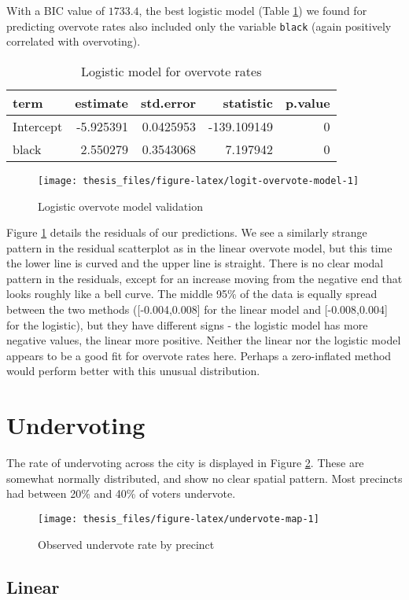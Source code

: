 \documentclass[12pt,twoside]{reedthesis}
\begin{document}
With a BIC value of \(1733.4\), the best logistic model (Table \ref{tab:logit-overvote-model}) we found for predicting overvote rates also included only the variable \texttt{black} (again positively correlated with overvoting).
\begin{table}[t]

\caption[Logit overvote model]{\label{tab:logit-overvote-model}Logistic model for overvote rates}
\centering
\begin{tabular}{lrrrr}
\toprule
term & estimate & std.error & statistic & p.value\\
\midrule
Intercept & -5.925391 & 0.0425953 & -139.109149 & 0\\
black & 2.550279 & 0.3543068 & 7.197942 & 0\\
\bottomrule
\end{tabular}
\end{table}
\begin{figure}
\texttt{[image: thesis\_files/figure-latex/logit-overvote-model-1]} \caption{Logistic overvote model validation}\label{fig:logit-overvote-model}
\end{figure}
Figure \ref{fig:logit-overvote-model} details the residuals of our predictions. We see a similarly strange pattern in the residual scatterplot as in the linear overvote model, but this time the lower line is curved and the upper line is straight. There is no clear modal pattern in the residuals, except for an increase moving from the negative end that looks roughly like a bell curve. The middle 95\% of the data is equally spread between the two methods ({[}-0.004,0.008{]} for the linear model and {[}-0.008,0.004{]} for the logistic), but they have different signs - the logistic model has more negative values, the linear more positive. Neither the linear nor the logistic model appears to be a good fit for overvote rates here. Perhaps a zero-inflated method would perform better with this unusual distribution.

\hypertarget{undervoting}{%
\section{Undervoting}\label{undervoting}}

The rate of undervoting across the city is displayed in Figure \ref{fig:undervote-map}. These are somewhat normally distributed, and show no clear spatial pattern. Most precincts had between 20\% and 40\% of voters undervote.
\begin{figure}
\texttt{[image: thesis\_files/figure-latex/undervote-map-1]} \caption{Observed undervote rate by precinct}\label{fig:undervote-map}
\end{figure}
\hypertarget{linear-2}{%
\subsection{Linear}\label{linear-2}}
\end{document}

